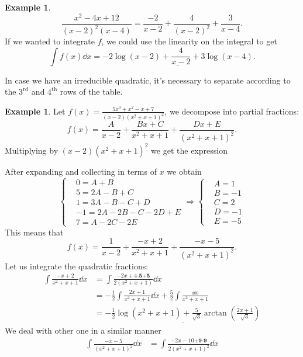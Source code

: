 \documentclass[12pt]{article}
\theoremstyle{plain}
\theoremstyle{definition}
\newtheorem{Ex}[Th]{Example}           %
\theoremstyle{remark}
\renewcommand{\:}{\colon}           %
\newcommand{\un}[1]{\underline{#1}}
\renewcommand{\.}{\Cdot}                %
\newcommand{\To}{\Rightarrow}
\begin{document}
\begin{multicols}{2}
\begin{Ex}
$$\frac{x^2-4x+12}{(x-2)^2(x-4)}=\frac{-2}{x-2}+\frac{4}{(x-2)^2}+\frac{3}{x-4}.$$
If we wanted to integrate $f$, we could use the linearity on the integral to get 
$$\int f(x)\dd x=\un{-2\log(x-2)+\frac{4}{x-2}+3\log(x-4)}.$$
  \end{Ex}
In case we have an irreducible quadratic, it's necessary to separate according to the $3^{\text{rd}}$ and $4^{\text{th}}$ rows of the table.
\begin{Ex}
  Let $f(x)=\frac{5x^3+x^2-x+7}{(x-2)(x^2+x+1)^2}$, we decompose into partial fractions:
  $$f(x)=\frac{A}{x-2}+\frac{Bx+C}{x^2+x+1}+\frac{Dx+E}{(x^2+x+1)^2}.$$
  Multiplying by $(x-2)(x^2+x+1)^2$ we get the expression
  \vspace*{-0.9em}
  \begin{center}
  \end{center}
  \vspace*{-0.9em}
 After expanding and collecting in terms of $x$ we obtain
 $$
 \left\lbrace
 \begin{aligned}
   &0=A+B\\
   &5=2A-B+C\\
   &1=3A-B-C+D\\
   &-1=2A-2B-C-2D+E\\
   &7=A-2C-2E
 \end{aligned}
 \right.\To
 \left\lbrace
 \begin{aligned}
   &A=1\\
   &B=-1\\
   &C=2\\
   &D=-1\\
   &E=-5
 \end{aligned}
 \right.
 $$
 This means that 
 $$f(x)=\frac{1}{x-2}+\frac{-x+2}{x^2+x+1}+\frac{-x-5}{(x^2+x+1)^2}.$$
 Let us integrate the quadratic fractions:
 \begin{align*}
  \int\frac{-x+2}{x^2+x+1}\dd x&=\int\frac{-2x+4\textbf{-5+5}}{2(x^2+x+1)}\dd x\\
  &=-\frac{1}{2}\int\frac{2x+1}{x^2+x+1}\dd x+\frac{5}{2}\int\frac{\dd x}{x^2+x+1}\\
  &=\un{-\frac{1}{2}\log(x^2+x+1)+\frac{5}{\sqrt{3}}\arctan\left(\frac{2x+1}{\sqrt{3}}\right)}
 \end{align*}
 We deal with other one in a similar manner
 \vspace*{0.2em}
 \begin{align*}
  \int\frac{-x-5}{(x^2+x+1)^2}\dd x&=\int\frac{-2x-10\textbf{+9-9}}{2(x^2+x+1)^2}\dd x\\

\end{align*}
\end{Ex}
\end{multicols}
\end{document}
